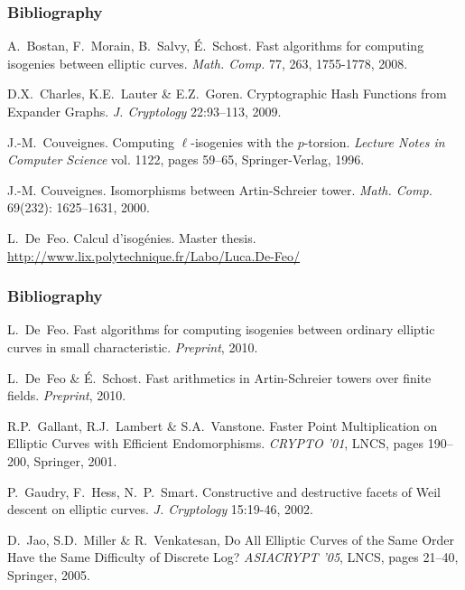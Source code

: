 \documentclass[10pt]{beamer}
\newcommand{\0}{\mathcal{O}}  %
\begin{document}
\begin{frame}
  \frametitle{Bibliography}

  \begin{thebibliography}{1}
    \beamertemplatearticlebibitems
    
   A.~Bostan,
    F.~Morain, B.~Salvy, É.~Schost.  \newblock Fast algorithms for
    computing isogenies between elliptic curves.
    \newblock \emph{Math. Comp.} 77, 263, 1755-1778, 2008.
    
    D.X.~Charles, K.E.~Lauter \& E.Z.~Goren.
    \newblock Cryptographic Hash Functions from Expander Graphs.
    \newblock \emph{J. Cryptology} 22:93--113, 2009.
    
  J.-M.~Couveignes.
    \newblock Computing $\ell$-isogenies with the $p$-torsion.
    \newblock \emph{Lecture Notes in Computer Science} vol. 1122, pages 59--65,
    Springer-Verlag, 1996.
    
   J.-M. Couveignes.
    \newblock Isomorphisms between {A}rtin-{S}chreier tower.
    \newblock \emph{Math. Comp.} 69(232): 1625--1631, 2000.

   L.~De~Feo.  \newblock Calcul d'isogénies.
    \newblock Master
    thesis. \url{http://www.lix.polytechnique.fr/Labo/Luca.De-Feo/}

  \end{thebibliography}
\end{frame}


\begin{frame}
  \frametitle{Bibliography}

  \begin{thebibliography}{1}

   L.~De~Feo.
    \newblock Fast algorithms for computing isogenies
    between ordinary elliptic curves in small characteristic.
    \newblock \emph{Preprint}, 2010.
      
   L.~De~Feo \& É.~Schost.  \newblock
    Fast arithmetics in Artin-Schreier towers over finite fields.
    \newblock \emph{Preprint}, 2010.

    R.P.~Gallant, R.J.~Lambert \& S.A.~Vanstone.
    \newblock Faster Point Multiplication on Elliptic Curves
    with Efficient Endomorphisms.
    \newblock \emph{CRYPTO '01}, LNCS, pages 190--200, Springer, 2001.
    
    P.~Gaudry, F.~Hess, N.~P.~Smart.
    \newblock Constructive and destructive facets of Weil
    descent on elliptic curves.
    \newblock \emph{J. Cryptology} 15:19-46, 2002.

    D.~Jao, S.D.~Miller \& R.~Venkatesan,
    \newblock Do All Elliptic Curves of the Same Order Have the Same 
    Difficulty of Discrete Log?
    \newblock \emph{ASIACRYPT '05}, LNCS, pages 21--40, Springer, 2005.

  \end{thebibliography}
\end{frame}
\end{document}
